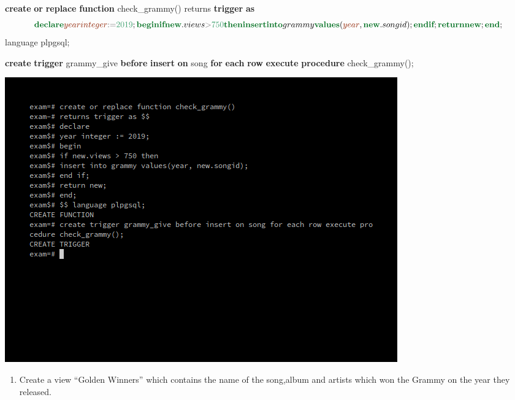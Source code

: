 \documentclass[
]{article}
\newenvironment{Shaded}{}{}
\newcommand{\ControlFlowTok}[1]{\textcolor[rgb]{0.00,0.44,0.13}{\textbf{#1}}}
\newcommand{\DataTypeTok}[1]{\textcolor[rgb]{0.56,0.13,0.00}{#1}}
\newcommand{\DecValTok}[1]{\textcolor[rgb]{0.25,0.63,0.44}{#1}}
\newcommand{\KeywordTok}[1]{\textcolor[rgb]{0.00,0.44,0.13}{\textbf{#1}}}
\newcommand{\NormalTok}[1]{#1}
\newcommand{\OperatorTok}[1]{\textcolor[rgb]{0.40,0.40,0.40}{#1}}
\providecommand{\tightlist}{%
  \setlength{\itemsep}{0pt}\setlength{\parskip}{0pt}}
\begin{document}
\begin{Shaded}
\begin{Highlighting}[]
\KeywordTok{create} \KeywordTok{or} \KeywordTok{replace} \KeywordTok{function}\NormalTok{ check\_grammy()}
\NormalTok{returns }\KeywordTok{trigger} \KeywordTok{as}\NormalTok{ $$}
\KeywordTok{declare}
\DataTypeTok{year} \DataTypeTok{integer} \OperatorTok{:=} \DecValTok{2019}\NormalTok{;}
\ControlFlowTok{begin}
\ControlFlowTok{if} \KeywordTok{new}\NormalTok{.views }\OperatorTok{>} \DecValTok{750} \ControlFlowTok{then}
\KeywordTok{insert} \KeywordTok{into}\NormalTok{ grammy }\KeywordTok{values}\NormalTok{(}\DataTypeTok{year}\NormalTok{, }\KeywordTok{new}\NormalTok{.songid);}
\ControlFlowTok{end} \ControlFlowTok{if}\NormalTok{;}
\KeywordTok{return} \KeywordTok{new}\NormalTok{;}
\ControlFlowTok{end}\NormalTok{;}
\NormalTok{$$ language plpgsql;}

\KeywordTok{create} \KeywordTok{trigger}\NormalTok{ grammy\_give }
   \KeywordTok{before} \KeywordTok{insert} \KeywordTok{on}\NormalTok{ song }
   \ControlFlowTok{for} \KeywordTok{each} \KeywordTok{row} 
   \KeywordTok{execute} \KeywordTok{procedure}\NormalTok{ check\_grammy();}
\end{Highlighting}
\end{Shaded}

\includegraphics{../Images/Exam_Report/5.png}

\begin{enumerate}
\def\labelenumi{\arabic{enumi}.}
\setcounter{enumi}{6}
\tightlist
\item
  Create a view ``Golden Winners'' which contains the name of the
  song,album and artists which won the Grammy on the year they released.
\end{enumerate}
\end{document}
